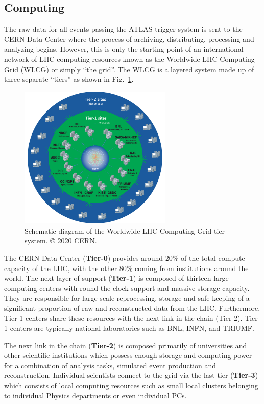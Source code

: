 \subsection{Computing}
The raw data for all events passing the ATLAS trigger system is sent to the CERN Data Center where the process of archiving, distributing, processing and analyzing begins.
However, this is only the starting point of an international network of LHC computing resources \cite{Bird:1447125} known as the Worldwide LHC Computing Grid (WLCG) or simply ``the grid''.
The WLCG is a layered system made up of three separate ``tiers'' as shown in Fig.~\ref{fig:wlcg_tiers}.

\begin{figure}
	\centering
	\includegraphics[width=0.65\textwidth]{wlcg_tiers}
	\caption{Schematic diagram of the Worldwide LHC Computing Grid tier system. © 2020 CERN.}
	\label{fig:wlcg_tiers}
\end{figure}

The CERN Data Center (\textbf{Tier-0}) provides around 20\% of the total compute capacity of the LHC, with the other 80\% coming from institutions around the world.
The next layer of support (\textbf{Tier-1}) is composed of thirteen large computing centers with round-the-clock support and massive storage capacity.
They are responsible for large-scale reprocessing, storage and safe-keeping of a significant proportion of raw and reconstructed data from the LHC.
Furthermore, Tier-1 centers share these resources with the next link in the chain (Tier-2).
Tier-1 centers are typically national laboratories such as BNL, INFN, and TRIUMF.

The next link in the chain (\textbf{Tier-2}) is composed primarily of universities and other scientific institutions which possess enough storage and computing power for a combination of analysis tasks, simulated event production and reconstruction.
Individual scientists connect to the grid via the last tier (\textbf{Tier-3}) which consists of local computing resources such as small local clusters belonging to individual Physics departments or even individual PCs.
